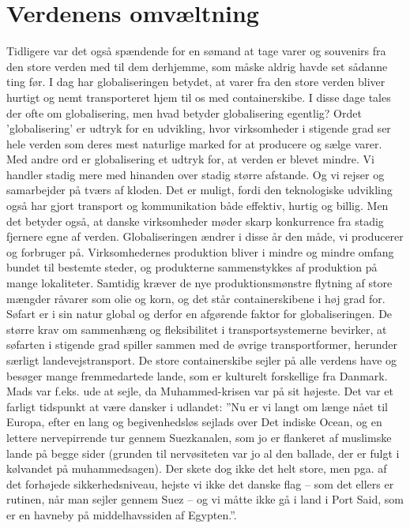 \chapter{Verdenens omvæltning}

Tidligere var det også spændende for en sømand at tage varer og
souvenirs fra den store verden med til dem derhjemme, som måske aldrig
havde set sådanne ting før. I dag har globaliseringen betydet, at varer
fra den store verden bliver hurtigt og nemt transporteret hjem til os
med containerskibe. I disse dage tales der ofte om globalisering, men
hvad betyder globalisering egentlig? Ordet 'globalisering' er udtryk for
en udvikling, hvor virksomheder i stigende grad ser hele verden som
deres mest naturlige marked for at producere og sælge varer. Med andre
ord er globalisering et udtryk for, at verden er blevet mindre. Vi
handler stadig mere med hinanden over stadig større afstande. Og vi
rejser og samarbejder på tværs af kloden. Det er muligt, fordi den
teknologiske udvikling også har gjort transport og kommunikation både
effektiv, hurtig og billig. Men det betyder også, at danske virksomheder
møder skarp konkurrence fra stadig fjernere egne af verden.
Globaliseringen ændrer i disse år den måde, vi producerer og forbruger
på. Virksomhedernes produktion bliver i mindre og mindre omfang bundet
til bestemte steder, og produkterne sammenstykkes af produktion på mange
lokaliteter. Samtidig kræver de nye produktionsmønstre flytning af store
mængder råvarer som olie og korn, og det står containerskibene i høj
grad for. Søfart er i sin natur global og derfor en afgørende faktor for
globaliseringen. De større krav om sammenhæng og fleksibilitet i
transportsystemerne bevirker, at søfarten i stigende grad spiller sammen
med de øvrige transportformer, herunder særligt landevejstransport. De
store containerskibe sejler på alle verdens have og besøger mange
fremmedartede lande, som er kulturelt forskellige fra Danmark. Mads var
f.eks. ude at sejle, da Muhammed-krisen var på sit højeste. Det var et
farligt tidspunkt at være dansker i udlandet: ''Nu er vi langt om længe
nået til Europa, efter en lang og begivenhedsløs sejlads over Det
indiske Ocean, og en lettere nervepirrende tur gennem Suezkanalen, som
jo er flankeret af muslimske lande på begge sider (grunden til
nervøsiteten var jo al den ballade, der er fulgt i kølvandet på
muhammedsagen). Der skete dog ikke det helt store, men pga. af det
forhøjede sikkerhedsniveau, hejste vi ikke det danske flag -- som det
ellers er rutinen, når man sejler gennem Suez -- og vi måtte ikke gå i
land i Port Said, som er en havneby på middelhavssiden af Egypten.''.

